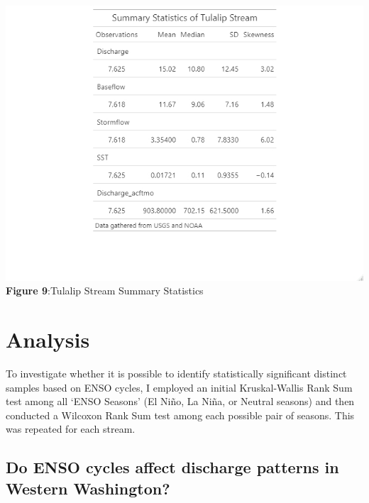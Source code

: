 \documentclass[
  12pt,
]{article}
\begin{document}
\includegraphics{Data/Processed/SummaryStats/TulaSummStats.jpeg}
\textbf{Figure 9}:Tulalip Stream Summary Statistics

\newpage

\hypertarget{analysis}{%
\section{Analysis}\label{analysis}}

To investigate whether it is possible to identify statistically
significant distinct samples based on ENSO cycles, I employed an initial
Kruskal-Wallis Rank Sum test among all `ENSO Seasons' (El Niño, La Niña,
or Neutral seasons) and then conducted a Wilcoxon Rank Sum test among
each possible pair of seasons. This was repeated for each stream.

\hypertarget{do-enso-cycles-affect-discharge-patterns-in-western-washington}{%
\subsection{Do ENSO cycles affect discharge patterns in Western
Washington?}\label{do-enso-cycles-affect-discharge-patterns-in-western-washington}}
\end{document}
